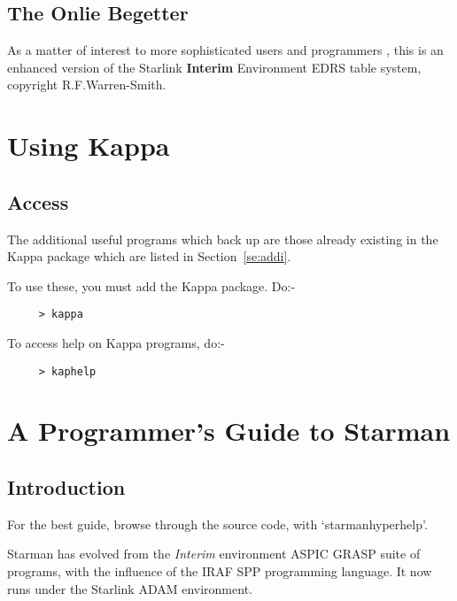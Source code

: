 \subsection{The Onlie Begetter}

As a matter of interest to more sophisticated users and programmers ,
this is an enhanced version of the Starlink {\bf Interim} Environment
EDRS table system, copyright R.F.Warren-Smith.





\section{Using Kappa } \label{se:packs}

\subsection{Access}

The additional useful programs which back up \starman are those already
existing in the Kappa package which are listed in
Section~\ref{se:addi}.

To use these, you must add the Kappa package. Do:-

\begin{verbatim}
     > kappa \end{verbatim}

To access help on Kappa programs, do:-

\begin{verbatim}
     > kaphelp \end{verbatim}



\section { A Programmer's Guide to Starman}

\subsection{Introduction}

For the best guide, browse through the source code, with
`starmanhyperhelp'.

Starman has evolved from the {\it Interim} environment ASPIC GRASP
suite of programs, with the influence of the IRAF SPP programming
language.  It now runs under the Starlink ADAM environment.

